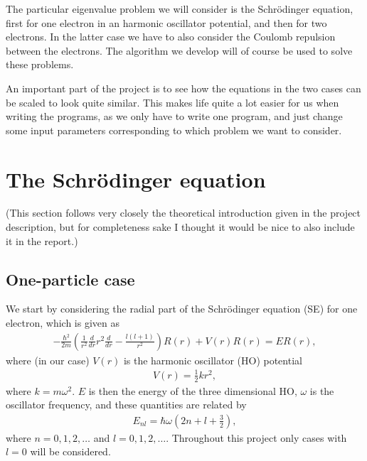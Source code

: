 \documentclass[12pt, a4paper]{article}
\begin{document}
The particular eigenvalue problem we will consider is the Schrödinger equation, first for one electron in 
an harmonic oscillator potential, and then for two electrons. In the latter case we have to also 
consider the Coulomb repulsion between the electrons. The algorithm we develop will of course be used 
to solve these problems. 

An important part of the project is to see how the equations in the two cases can be scaled to look 
quite similar. This makes life quite a lot easier for us when writing the programs, as we only have to 
write one program, and just change some input parameters corresponding to which problem we want to 
consider.   

\section{The Schrödinger equation}

(This section follows very closely the theoretical introduction given in the project description, but 
for completeness sake I thought it would be nice to also include it in the report.) 

\subsection{One-particle case}

We start by considering the radial part of the Schrödinger equation (SE) for one electron, which is 
given as 
\begin{align}
- \frac{\hbar^2}{2m}\left( \frac{1}{r^2} \frac{d}{dr}r^2 \frac{d}{dr} - \frac{l(l+1)}{r^2} \right) R(r) 
+ V(r) R(r) = ER(r),
\label{eq:SE}    
\end{align}    
where (in our case) $V(r)$ is the harmonic oscillator (HO) potential 
\begin{align*}
V(r) = \frac{1}{2} k r^2, 
\end{align*}
where $k = m\omega^2$. $E$ is then the energy of the three dimensional HO, $\omega$ is the 
oscillator frequency, and these quantities are related by 
\begin{align*}
E_{nl} = \hbar \omega \left( 2n + l + \frac{3}{2} \right), 
\end{align*}
where $n = 0,1,2,\dots$ and $l = 0,1,2,\dots$. Throughout this project only cases with $l = 0$ will be 
considered. 
\end{document}
